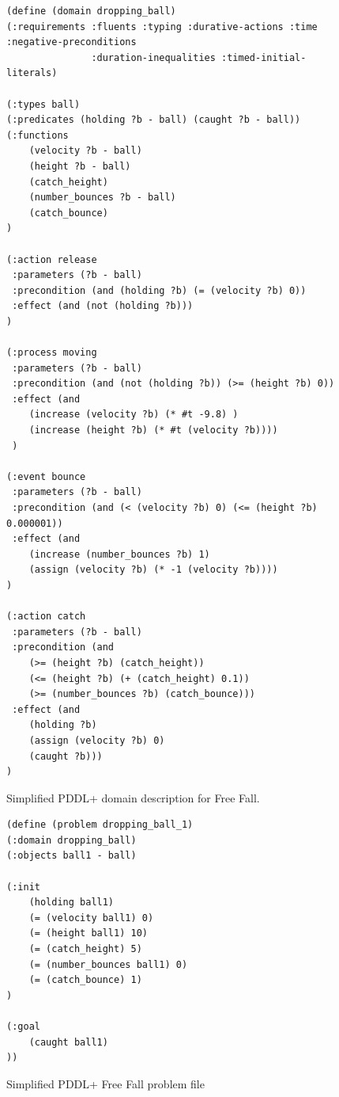 \begin{figure}[thb]
\small
\begin{BVerbatim}
(define (domain dropping_ball)
(:requirements :fluents :typing :durative-actions :time :negative-preconditions 
               :duration-inequalities :timed-initial-literals) 

(:types ball)
(:predicates (holding ?b - ball) (caught ?b - ball))
(:functions
    (velocity ?b - ball)
    (height ?b - ball)
    (catch_height)
    (number_bounces ?b - ball)
    (catch_bounce)
)

(:action release
 :parameters (?b - ball)
 :precondition (and (holding ?b) (= (velocity ?b) 0))
 :effect (and (not (holding ?b)))
)

(:process moving
 :parameters (?b - ball)
 :precondition (and (not (holding ?b)) (>= (height ?b) 0))
 :effect (and
    (increase (velocity ?b) (* #t -9.8) )
    (increase (height ?b) (* #t (velocity ?b))))
 )
 
(:event bounce
 :parameters (?b - ball)
 :precondition (and (< (velocity ?b) 0) (<= (height ?b) 0.000001))
 :effect (and 
    (increase (number_bounces ?b) 1)
    (assign (velocity ?b) (* -1 (velocity ?b))))
)

(:action catch
 :parameters (?b - ball)
 :precondition (and
    (>= (height ?b) (catch_height))
    (<= (height ?b) (+ (catch_height) 0.1))
    (>= (number_bounces ?b) (catch_bounce)))
 :effect (and
    (holding ?b)
    (assign (velocity ?b) 0)
    (caught ?b)))
)

\end{BVerbatim}
\caption{Simplified PDDL+ domain description for Free Fall.}
\label{fig:freefall domain}
\end{figure}

\begin{figure}[thb]
\small
\centering
\begin{BVerbatim}
(define (problem dropping_ball_1)
(:domain dropping_ball)
(:objects ball1 - ball)

(:init 
    (holding ball1)
    (= (velocity ball1) 0)
    (= (height ball1) 10)
    (= (catch_height) 5)
    (= (number_bounces ball1) 0)
    (= (catch_bounce) 1)
)

(:goal
    (caught ball1)
))
\end{BVerbatim}
\caption{Simplified PDDL+ Free Fall problem file}
\label{fig:freefall problem}
\end{figure}

